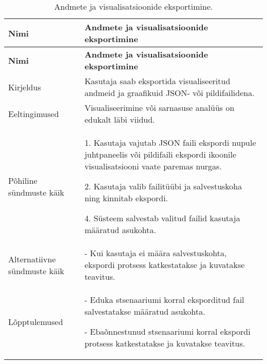 \begin{longtable}{|p{2.5cm}|p{11cm}|}
    \caption{{Andmete ja visualisatsioonide eksportimine.}}
    \label{tab:kasutusjuht6}\\ \hline
    \textbf{Nimi} &  \textbf{Andmete ja visualisatsioonide eksportimine}  \\
    \hline
    \endfirsthead
    \hline
    \textbf{Nimi} &  \textbf{Andmete ja visualisatsioonide eksportimine}  \\
    \hline
    \endhead
    \hline
    \endfoot
    \hline
    \endlastfoot
    Kirjeldus & Kasutaja saab eksportida visualiseeritud andmeid ja graafikuid JSON- või pildifailidena.\\ \hline
    Eeltingimused & Visualiseerimine või sarnasuse analüüs on edukalt läbi viidud.\\ \hline
    Põhiline sündmuste käik & 
    1. Kasutaja vajutab JSON faili ekspordi nupule juhtpaneelis või pildifaili ekspordi ikoonile visualisatsiooni vaate paremas nurgas.
    
    2. Kasutaja valib failitüübi ja salvestuskoha ning kinnitab ekspordi.
    
    4. Süsteem salvestab valitud failid kasutaja määratud asukohta.
    \\ \hline
    Alternatiivne sündmuste käik & 
    - Kui kasutaja ei määra salvestuskohta, ekspordi protsess katkestatakse ja kuvatakse teavitus.
    \\ \hline
    Lõpptulemused & 
    - Eduka stsenaariumi korral eksporditud fail salvestatakse määratud asukohta.
    
    - Ebaõnnestunud stsenaariumi korral ekspordi protsess katkestatakse ja kuvatakse teavitus.
    \\ \hline
\end{longtable}



